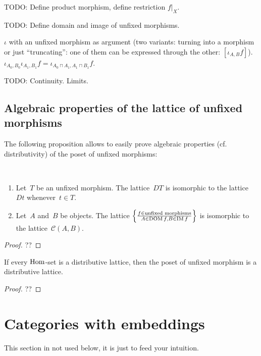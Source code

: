 TODO: Define product morphism, define restriction $f|_X$.

TODO: Define domain and image of unfixed morphisms.

$\iota$ with an unfixed morphism as argument (two variants:
turning into a morphism or just ``truncating'':
one of them can be expressed through the other:
$[\iota_{A,B}f]$).
$\iota_{A_0,B_0}\iota_{A_1,B_1}f=
\iota_{A_0\sqcap A_1,A_1\sqcap B_1}f$.

TODO: Continuity. Limits.

\subsection{Algebraic properties of the lattice of unfixed
morphisms}

The following proposition allows to easily prove algebraic
properties (cf. distributivity) of the poset of unfixed morphisms:

\begin{prop}
~
\begin{enumerate}
\item Let~$T$ be an unfixed morphism. The lattice~$DT$ is
isomorphic to the lattice $Dt$ whenever~$t\in T$.
\item Let~$A$ and~$B$ be objects. The lattice
$\left\{ \frac{f\in\text{unfixed morphisms}}{A\in\operatorname{DOM}f,B\in\operatorname{IM}f}\right\}$
is isomorphic to the lattice~$\mathcal{C}(A,B)$.
\end{enumerate}
\end{prop}

\begin{proof}
??
\end{proof}

\begin{prop}
If every $\operatorname{Hom}$-set is a distributive lattice, then
the poset of unfixed morphism is a distributive lattice.
\end{prop}

\begin{proof}
??
\end{proof}

\section{Categories with embeddings}

\begin{note}
This section in not used below, it is just to feed your intuition.
\end{note}

